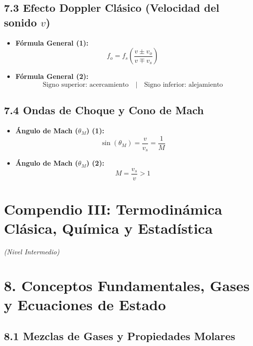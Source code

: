 \documentclass[11pt,a4paper]{article}
\begin{document}
\subsection*{7.3 Efecto Doppler Clásico (Velocidad del sonido $v$)}

\begin{itemize}
  \item \textbf{Fórmula General (1):}
  \[
    f_o = f_s \left( \frac{v \pm v_o}{v \mp v_s} \right)
  \]
  \item \textbf{Fórmula General (2):}
  \[
    \text{Signo superior: acercamiento} \quad | \quad \text{Signo inferior: alejamiento}
  \]
\end{itemize}

\subsection*{7.4 Ondas de Choque y Cono de Mach}

\begin{itemize}
  \item \textbf{Ángulo de Mach ($\theta_M$) (1):}
  \[
    \sin(\theta_M) = \frac{v}{v_s} = \frac{1}{M}
  \]
  \item \textbf{Ángulo de Mach ($\theta_M$) (2):}
  \[
    M = \frac{v_s}{v} > 1
  \]
\end{itemize}

\section*{Compendio III: Termodinámica Clásica, Química y Estadística}

\textit{(Nivel Intermedio)}

\section*{8. Conceptos Fundamentales, Gases y Ecuaciones de Estado}

\subsection*{8.1 Mezclas de Gases y Propiedades Molares}
\end{document}
